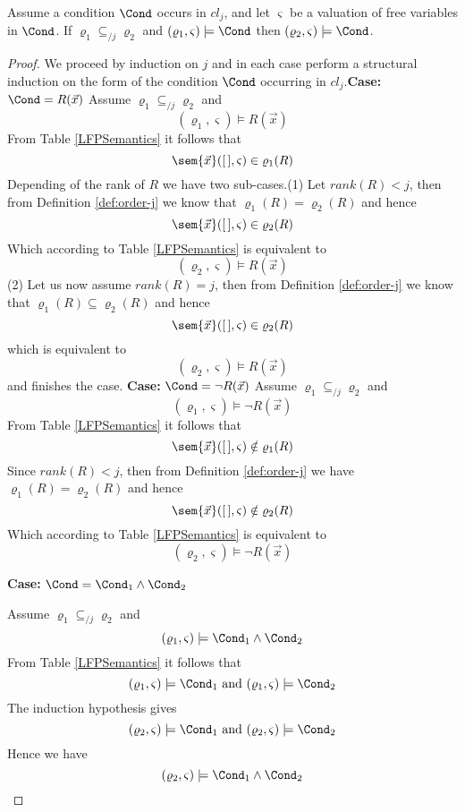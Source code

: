 \begin{lemma}\label{lemma:cond}
  Assume a condition $\Cond$ occurs in $cl_j$, and let $\varsigma$ be
  a valuation of free variables in $\Cond$. If $\varrho_1
  \subseteq_{/j} \varrho_2$ and $(\varrho_1,\varsigma) \models \Cond$
  then $(\varrho_2,\varsigma) \models \Cond$.
\end{lemma}
\begin{proof}
  We proceed by induction on $j$ and in each case perform a structural
  induction on the form of the condition $\Cond$ occurring in
  $cl_j$.\newline \textbf{Case: }$\Cond=R(\vec x)$ \newline Assume
  $\varrho_1 \subseteq_{/j} \varrho_2$ and
$$
(\varrho_1,\varsigma) \models R(\vec x)
$$
From Table \ref{LFPSemantics} it follows that
$$
\sem{\vec x}([\,], \varsigma) \in \varrho_1(R)
$$
Depending of the rank of $R$ we have two sub-cases.\newline (1) Let
$rank(R)<j$, then from Definition \ref{def:order-j} we know that
$\varrho_1(R) = \varrho_2(R)$ and hence
$$
\sem{\vec x}([\,], \varsigma) \in \varrho_2(R)
$$
Which according to Table \ref{LFPSemantics} is equivalent to
$$
(\varrho_2,\varsigma) \models R(\vec x)
$$
(2) Let us now assume $rank(R)=j$, then from Definition
\ref{def:order-j} we know that $\varrho_1(R) \subseteq \varrho_2(R)$ and hence
$$
\sem{\vec x}([\,], \varsigma) \in \varrho_2(R)
$$
which is equivalent to
$$
(\varrho_2,\varsigma) \models R(\vec x)
$$
and finishes the case. \newline \textbf{Case: }$\Cond=\neg R(\vec x)$
\newline Assume $\varrho_1 \subseteq_{/j} \varrho_2$ and
$$
(\varrho_1,\varsigma) \models \neg R(\vec x)
$$
From Table \ref{LFPSemantics} it follows that
$$
\sem{\vec x}([\,], \varsigma) \notin \varrho_1(R)
$$
Since $rank(R)<j$, then from Definition \ref{def:order-j} we have
$\varrho_1(R) = \varrho_2(R)$ and hence
$$
\sem{\vec x}([\,], \varsigma) \notin \varrho_2(R)
$$
Which according to Table \ref{LFPSemantics} is equivalent to
$$
(\varrho_2,\varsigma) \models \neg R(\vec x)
$$

\noindent \textbf{Case: }$\Cond=\Cond_1 \wedge \Cond_2$

\noindent Assume $\varrho_1 \subseteq_{/j} \varrho_2$ and
$$
(\varrho_1,\varsigma) \models \Cond_1 \wedge \Cond_2
$$
From Table \ref{LFPSemantics} it follows that
$$
(\varrho_1,\varsigma) \models \Cond_1 \text{ and } (\varrho_1,\varsigma) \models \Cond_2
$$
The induction hypothesis gives
$$
(\varrho_2,\varsigma) \models \Cond_1 \text{ and } (\varrho_2,\varsigma) \models \Cond_2
$$
Hence we have 
$$
(\varrho_2,\varsigma) \models \Cond_1 \wedge \Cond_2
$$


\end{proof}

